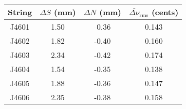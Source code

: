 \begin{tabular}{cccc}
\toprule
String & $\Delta S$ (mm) & $\Delta N$ (mm) & $\overline{\Delta \nu}_\text{rms}$ (cents) \\
\midrule
J4601 & 1.50 & -0.36 & 0.143 \\
J4602 & 1.82 & -0.40 & 0.160 \\
J4603 & 2.34 & -0.42 & 0.174 \\
J4604 & 1.54 & -0.35 & 0.138 \\
J4605 & 1.88 & -0.36 & 0.147 \\
J4606 & 2.35 & -0.38 & 0.158 \\
\bottomrule
\end{tabular}
